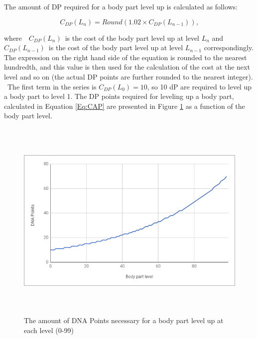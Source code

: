 \documentclass[12pt]{article}
\begin{document}
{The amount of DP required for a body part level up is calculated as follows:
\begin{center}
   \begin{equation} \label{Eq:CAP}
     C_{DP}(L_n) = Round(1.02 \times C_{DP}(L_{n-1})),
   \end{equation}
\end{center}
where\ \  $C_{DP}(L_n)$\ is the cost of the body part level up at level  $L_n$  and $C_{DP}(L_{n-1})$\ is the cost of the body part level up at level  $L_{n-1}$  correspondingly. The expression on the right hand side of the equation is rounded to the nearest hundredth, and this value is then used for the calculation of the cost at the next level and so on (the actual DP points are further rounded to the nearest integer). \ The first term in the series is  $C_{DP}(L_0)=10$, so 10 dP are required to level up a body part to level 1.  The DP points required for leveling up a body part, calculated in Equation \ref{Eq:CAP} are presented in Figure  \ref{fig:The_amount_of_Action_Points_necessary_for_a_body_part_level_up_at_each_level_099} as a function of the body part level.\par
\begin{Center}



\begin{figure}[!ht]
	\begin{Center}
		\includegraphics[width=6.27in,height=3.89in]{./media/image20.png}
		\caption{The amount of DNA Points necessary for a body part level up at each level (0-99)}
		\label{fig:The_amount_of_Action_Points_necessary_for_a_body_part_level_up_at_each_level_099}
	\end{Center}
\end{figure}



\end{Center}}
\end{document}
